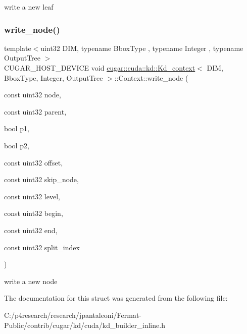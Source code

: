 write a new leaf \mbox{\label{structcugar_1_1cuda_1_1kd_1_1_kd__context_1_1_context_a62ebef4047ff66f5e575fbcf48786e87}} 
\subsubsection{\texorpdfstring{write\+\_\+node()}{write\_node()}}
{\footnotesize\ttfamily template$<$uint32 D\+IM, typename Bbox\+Type , typename Integer , typename Output\+Tree $>$ \\
C\+U\+G\+A\+R\+\_\+\+H\+O\+S\+T\+\_\+\+D\+E\+V\+I\+CE void \hyperlink{structcugar_1_1cuda_1_1kd_1_1_kd__context}{cugar\+::cuda\+::kd\+::\+Kd\+\_\+context}$<$ D\+IM, Bbox\+Type, Integer, Output\+Tree $>$\+::Context\+::write\+\_\+node (\begin{DoxyParamCaption}\item[{const uint32}]{node,  }\item[{const uint32}]{parent,  }\item[{bool}]{p1,  }\item[{bool}]{p2,  }\item[{const uint32}]{offset,  }\item[{const uint32}]{skip\+\_\+node,  }\item[{const uint32}]{level,  }\item[{const uint32}]{begin,  }\item[{const uint32}]{end,  }\item[{const uint32}]{split\+\_\+index }\end{DoxyParamCaption})\hspace{0.3cm}{\ttfamily [inline]}}

write a new node 

The documentation for this struct was generated from the following file\+:\begin{DoxyCompactItemize}
\item 
C\+:/p4research/research/jpantaleoni/\+Fermat-\/\+Public/contrib/cugar/kd/cuda/kd\+\_\+builder\+\_\+inline.\+h\end{DoxyCompactItemize}
